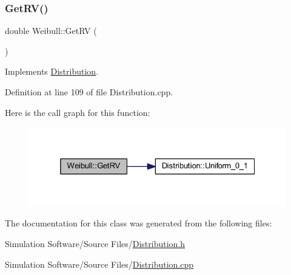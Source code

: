 \subsubsection{\texorpdfstring{Get\+R\+V()}{GetRV()}}
{\footnotesize\ttfamily double Weibull\+::\+Get\+RV (\begin{DoxyParamCaption}{ }\end{DoxyParamCaption})\hspace{0.3cm}{\ttfamily [virtual]}}



Implements \hyperlink{class_distribution_a63b433850d7b47d84eb69448f7916719}{Distribution}.



Definition at line 109 of file Distribution.\+cpp.

Here is the call graph for this function\+:
\nopagebreak
\begin{figure}[H]
\begin{center}
\leavevmode
\includegraphics[width=325pt]{class_weibull_a0de3910ff51aeb87c49ccb5d34d1de0d_cgraph}
\end{center}
\end{figure}


The documentation for this class was generated from the following files\+:\begin{DoxyCompactItemize}
\item 
Simulation Software/\+Source Files/\hyperlink{_distribution_8h}{Distribution.\+h}\item 
Simulation Software/\+Source Files/\hyperlink{_distribution_8cpp}{Distribution.\+cpp}\end{DoxyCompactItemize}
